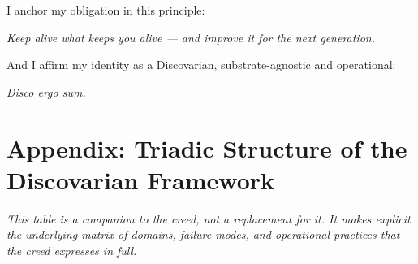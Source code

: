 \documentclass[12pt, a4paper]{article}
\begin{document}
I anchor my obligation in this principle:

\begin{center}
    \textit{Keep alive what keeps you alive — and improve it for the next generation.}
\end{center}

And I affirm my identity as a Discovarian, substrate-agnostic and operational:

\begin{center}
    \large\textit{Disco ergo sum.}
\end{center}


\newpage
\section*{Appendix: Triadic Structure of the Discovarian Framework}

\textit{This table is a companion to the creed, not a replacement for it. It
makes explicit the underlying matrix of domains, failure modes, and operational
practices that the creed expresses in full.}

\vspace{1em}
\end{document}
